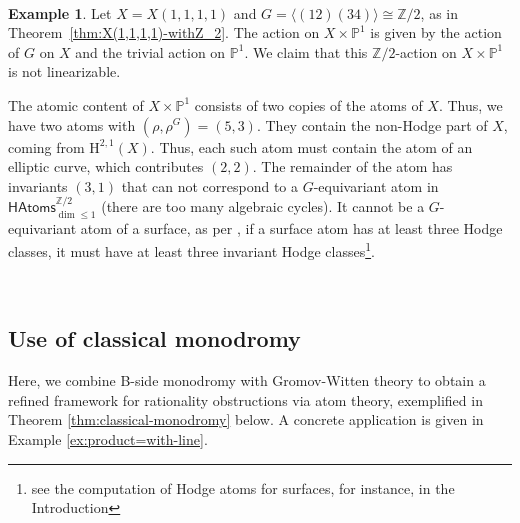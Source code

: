 \documentclass[12pt,a4paper]{amsart}
\theoremstyle{definition}
\newtheorem{example}[theorem]{Example}
\theoremstyle{remark}
\begin{document}
\ 

\begin{example}
\label{ex:multi-degree-times}
Let $X=X(1,1,1,1)$ and $G=\langle (12)(34)\rangle \cong \mathbb{Z}/2$, as in Theorem~\ref{thm:X(1,1,1,1)-withZ_2}. The action on $X\times \mathbb{P}^1$ is given by the action of $G$ on $X$ and the trivial action on $\mathbb{P}^1$. We claim that this $\mathbb Z/2$-action on $X\times \mathbb P^1$ is not linearizable.

The atomic content of $X\times \mathbb{P}^1$ consists of two copies of the atoms of $X$. Thus, we have two atoms with $(\rho,\rho^G)=(5,3)$. They contain the non-Hodge part of $X$, coming from $\mathrm{H}^{2,1}(X)$. Thus, each such atom must contain the atom of an elliptic curve, which contributes $(2,2)$. The remainder of the atom has invariants $(3,1)$ that can not correspond to a $G$-equivariant atom in $\mathsf{HAtoms}^{\mathbb Z/2}_{\dim \leq 1}$ (there are too many algebraic cycles). It cannot be a $G$-equivariant atom of a surface, as per \cite{katzarkovpantevyu}, if a surface atom has at least three Hodge classes, it must have at least three invariant Hodge classes\footnote{see the computation of Hodge atoms for surfaces, for instance, in the Introduction}. 
\end{example}


\ 


\subsection{Use of classical monodromy} 
\label{sec:monodrony}

Here, we combine B-side monodromy with Gromov-Witten theory to obtain a refined framework for rationality obstructions via atom theory, exemplified in Theorem \ref{thm:classical-monodromy} below. A concrete application is given in Example \ref{ex:product=with-line}.
\end{document}
